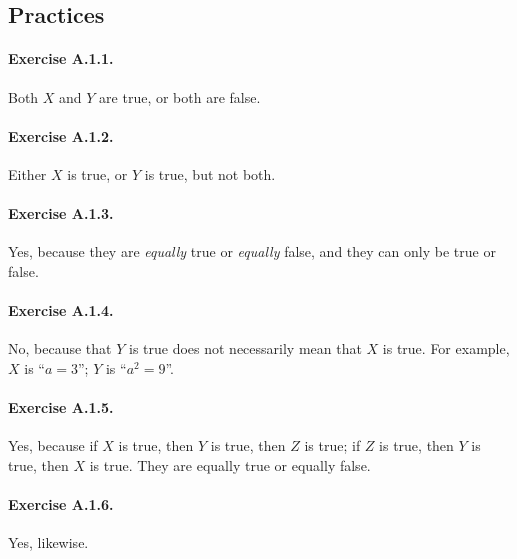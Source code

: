 \subsection{Practices}
\paragraph{Exercise A.1.1.} Both $X$ and $Y$ are true, or both are false.

\paragraph{Exercise A.1.2.} Either $X$ is true, or $Y$ is true, but not both.

\paragraph{Exercise A.1.3.} Yes, because they are \emph{equally} true or \emph{equally} false, and they can only be true or false.

\paragraph{Exercise A.1.4.} No, because that $Y$ is true does not necessarily mean that $X$ is true. For example, $X$ is ``$a=3$''; $Y$ is ``$a^2=9$''.

\paragraph{Exercise A.1.5.} Yes, because if $X$ is true, then $Y$ is true, then $Z$ is true; if $Z$ is true, then $Y$ is true, then $X$ is true. They are equally true or equally false.

\paragraph{Exercise A.1.6.} Yes, likewise.

